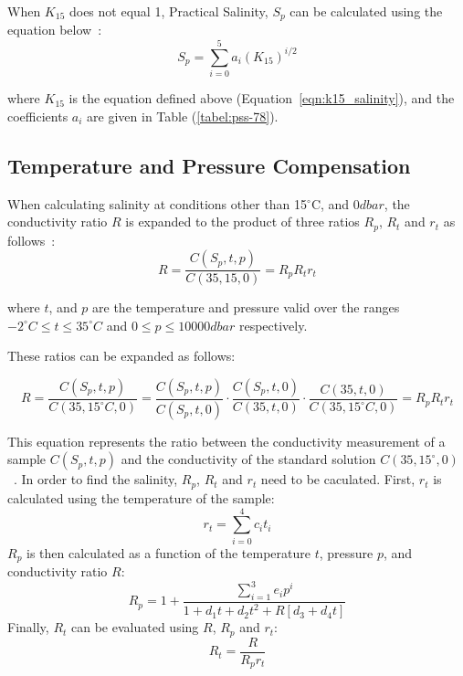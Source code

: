 When $K_{15}$ does not equal 1, Practical Salinity, $S_p$ can be calculated using the equation below~\cite{teos-10}: 
\begin{equation}\label{eqn:salinity_short}
    S_p = \sum_{i=0}^{5}a_i{(K_{15})}^{i/2} 
\end{equation}

where $K_{15}$ is the equation defined above (Equation~\ref{eqn:k15_salinity}), and the coefficients $a_i$ are given in Table (\ref{tabel:pss-78}).


\subsection{Temperature and Pressure Compensation}\label{sec:salinity_compensation}
When calculating salinity at conditions other than 15$^\circ$C, and $0dbar$, the conductivity ratio $R$ is expanded to the product of three ratios $R_p$, $R_t$ and $r_t$ as follows~\cite{teos-10}:
\begin{equation}
    R=\frac{C(S_p, t, p)}{C(35, 15, 0)} = R_p R_t r_t
\end{equation}

where $t$, and $p$ are the temperature and pressure valid over the ranges $-2^{\circ}C \leq t \leq 35^{\circ}C$ and $0 \leq p \leq 10 000dbar$ respectively.

These ratios can be expanded as follows:

\begin{equation}
    R = \frac{C(S_p, t, p)}{C(35, 15^{\circ} C, 0)} = \frac{C(S_p, t, p)}{C(S_p, t, 0)} \cdot \frac{C(S_p, t, 0)}{C(35, t, 0)} \cdot \frac{C(35, t, 0)}{C(35, 15^{\circ} C, 0)} = R_p R_t r_t
\end{equation}

This equation represents the ratio between the conductivity measurement of a sample $C(S_p,t,p)$ and the conductivity of the standard solution $C(35, 15^{\circ}, 0)$~\cite{teos-10}. 
In order to find the salinity, $R_p$, $R_t$ and $r_t$ need to be caculated.
First, $r_t$ is calculated using the temperature of the sample:
\begin{equation}
    r_t = \sum_{i=0}^{4} {c_i}{t_i}
\end{equation}
$R_p$ is then calculated as a function of the temperature $t$, pressure $p$, and conductivity ratio $R$:
\begin{equation}
    R_p = 1 + \frac{\sum_{i=1}^{3}{e_i}{p^i}}{1+d_1{t}+d_2{t^2}+R[d_3+d_4 {t}]}
\end{equation}
Finally, $R_t$ can be evaluated using $R$, $R_p$ and $r_t$:
\begin{equation}
    R_t = \frac{R}{{R_p}{r_t}}
\end{equation} 

